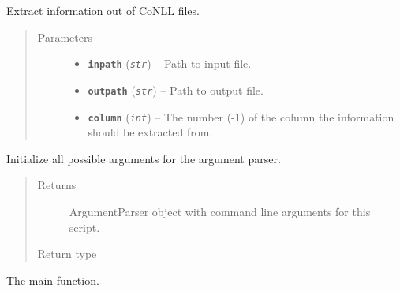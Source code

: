 \documentclass[letterpaper,10pt,english]{sphinxmanual}
\begin{document}
\begin{fulllineitems}
\label{src.prep.corpus:src.prep.corpus.extract_conll.extract_conll}
Extract information out of CoNLL files.
\begin{quote}\begin{description}
\item[{Parameters}] \leavevmode\begin{itemize}
\item {} 
\textbf{\texttt{inpath}} (\emph{\texttt{str}}) -- Path to input file.

\item {} 
\textbf{\texttt{outpath}} (\emph{\texttt{str}}) -- Path to output file.

\item {} 
\textbf{\texttt{column}} (\emph{\texttt{int}}) -- The number (-1) of the column the information should be extracted from.

\end{itemize}

\end{description}\end{quote}

\end{fulllineitems}


\begin{fulllineitems}
\label{src.prep.corpus:src.prep.corpus.extract_conll.init_argparse}
Initialize all possible arguments for the argument parser.
\begin{quote}\begin{description}
\item[{Returns}] \leavevmode
ArgumentParser object with command line arguments for this script.

\item[{Return type}] \leavevmode
{}

\end{description}\end{quote}

\end{fulllineitems}


\begin{fulllineitems}
\label{src.prep.corpus:src.prep.corpus.extract_conll.main}
The main function.

\end{fulllineitems}
\end{document}
